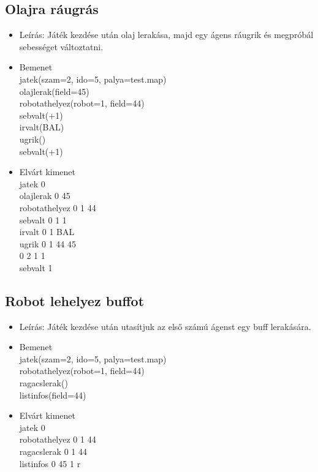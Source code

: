 \subsection{Olajra ráugrás}
\begin{itemize}
	\item Leírás: Játék kezdése után olaj lerakása, majd egy ágens ráugrik és megpróbál sebességet változtatni. 
	\item Bemenet\\	
		jatek(szam=2, ido=5, palya=test.map) \\
		olajlerak(field=45) \\
		robotathelyez(robot=1, field=44) \\
		sebvalt(+1) \\
		irvalt(BAL) \\
		ugrik() \\
		sebvalt(+1)	\\
	\item Elvárt kimenet\\
		jatek 0 \\
		olajlerak 0 45 \\
		robotathelyez 0 1 44 \\
		sebvalt 0 1 1 \\
		irvalt 0 1 BAL \\
		ugrik 0 1 44 45 \\
		      0 2 1 1 \\
		sebvalt 1 \\
\end{itemize}

\subsection{Robot lehelyez buffot}
\begin{itemize}
	\item Leírás: Játék kezdése után utasítjuk az első számú ágenst egy buff lerakására.
	\item Bemenet\\	
		jatek(szam=2, ido=5, palya=test.map) \\
		robotathelyez(robot=1, field=44) \\
		ragacslerak() \\
		listinfos(field=44) \\
	\item Elvárt kimenet\\
		jatek 0 \\
		robotathelyez 0 1 44 \\
		ragacslerak 0 1 44 \\
		listinfos 0 45 1 r\\		
\end{itemize}


